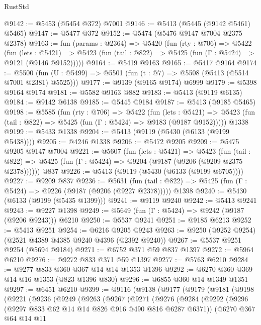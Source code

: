 \begin{lexlean}{RustStd}
\begin{coremodule}
@9142 := @5453 (@5454 @372) @7001
@9146 := @5413 (@5445 (@9142 @5461) @5465)
@9147 := @5477 @372
@9152 := @5474 (@5476 @9147 @7004 @2375 @2378)
@9163 := fun (params : @2364) =>
  @5420
    (fun (rty : @706) =>
    @5422
      (fun (lets : @5421) =>
      @5423 (fun (tail : @822) => @5425 (fun (Γ : @5424) => @9121 (@9146 @9152)))))
@9164 := @5419 @9163
@9165 := @5417 @9164
@9174 := @5500 (fun (U : @5499) => @5501 (fun (t : @7) => @5508 (@5413 (@5514 @7001 @2381) @5525)))
@9177 := @9139 (@9165 @9174) @6999
@9179 := @5398 @9164 @9174
@9181 := @5582 @9163 @882
@9183 := @5413 (@9119 @6135)
@9184 := @9142 @6138
@9185 := @5445 @9184
@9187 := @5413 (@9185 @5465)
@9198 := @5585
    (fun (rty : @706) =>
    @5422
      (fun (lets : @5421) =>
      @5423 (fun (tail : @822) => @5425 (fun (Γ : @5424) => @9183 (@9187 @9152)))))
    @1338
@9199 := @5433 @1338
@9204 := @5413 (@9119 (@5430 (@6133 (@9199 @5438))))
@9205 := @4246 @1338
@9206 := @5472 @9205
@9209 := @5475 @9205 @9147 @7004
@9221 := @5607
    (fun (lets : @5421) =>
    @5423
      (fun (tail : @822) => @5425 (fun (Γ : @5424) => @9204 (@9187 (@9206 (@9209 @2375 @2378))))))
    @837
@9226 := @5413 (@9119 (@5430 (@6133 (@9199 @6705))))
@9227 := @9209 @837
@9236 := @5631
    (fun (tail : @822) => @5425 (fun (Γ : @5424) => @9226 (@9187 (@9206 (@9227 @2378)))))
    @1398
@9240 := @5430 (@6133 (@9199 (@5435 @1399)))
@9241 := @9119 @9240
@9242 := @5413 @9241
@9243 := @9227 @1398
@9249 := @5649 (fun (Γ : @5424) => @9242 (@9187 (@9206 @9243))) @6210
@9250 := @5537 @9241
@9251 := @9185 @6213
@9252 := @5413 @9251
@9254 := @6216 @9205 @9243
@9263 := @9250 (@9252 @9254) (@2521 @4389 @4385 @9240 @4396 (@2392 @9240))
@9267 := @5537 @9251 @9254 (@5694 @9184)
@9271 := @6752 @371 @59 @837 @1397
@9272 := @5964 @6210
@9276 := @9272 @833 @371 @59 @1397
@9277 := @5763 @6210
@9284 := @9277 @833 @360 @367 @14 @14 @1353 @1396
@9292 := @6270 @360 @369 @14 @16 @1353 (@823 @1396 @830)
@9296 := @6855 @360 @14 @1349 @1351
@9297 := @6451 @6210
@9399 := @9116
    (@9138
      (@9177
        (@9179
          (@9181
            (@9198
              (@9221
                (@9236
                  (@9249
                    (@9263
                      (@9267
                        (@9271
                          (@9276
                            (@9284
                              (@9292
                                (@9296 (@9297 @833 @62 @14 @14 @826 @916 @490 @816 @6287 @6371))
                                (@6270
                                  @367
                                  @64
                                  @14
                                  @11

\end{coremodule}
\end{lexlean}
